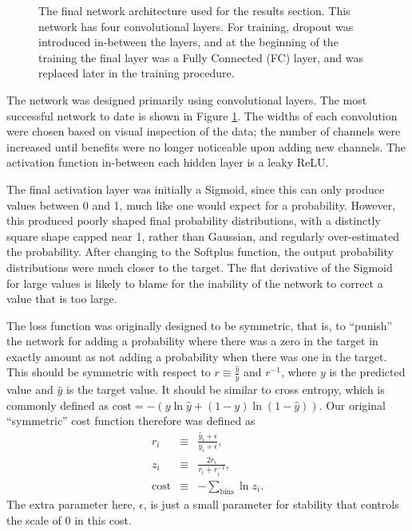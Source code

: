 \documentclass[a4paper]{jpconf}
\begin{document}
\begin{figure}
	\centering
	
	\caption{The final network architecture used for the results section. This network has four convolutional layers. For training, dropout was introduced in-between the layers, and at the beginning of the training the final layer was a Fully Connected (FC) layer, and was replaced later in the training procedure.}
	\label{fig:nnarch}
\end{figure}

The network was designed primarily using convolutional layers. The most successful network to date is shown in Figure \ref{fig:nnarch}. The widths of each convolution were chosen based on visual inspection of the data; the number of channels were increased until benefits were no longer noticeable upon adding new channels. The activation function in-between each hidden layer is a leaky ReLU.

The final activation layer was initially a Sigmoid, since this can only produce values between 0 and 1, much like one would expect for a probability. However, this produced poorly shaped final probability distributions, with a distinctly square shape capped near 1, rather than Gaussian, and regularly over-estimated the probability. After changing to the Softplus function, the output probability distributions were much closer to the target. The flat derivative of the Sigmoid for large values is likely to blame for the inability of the network to correct a value that is too large.

The loss function was originally designed to be symmetric, that is, to ``punish'' the network for adding a probability where there was a zero in the target in exactly amount as not adding a probability when there was one in the target. This should be symmetric with respect to  $r \equiv \frac{\hat y}{y}$ and $r^{-1}$, where $y$ is the predicted value and $\hat y$ is the target value. It should be similar to cross entropy, which is commonly defined as
%
$
\mathrm{cost} = - \left(
y \ln \hat y + (1-y) \ln (1 - \hat y)
\right)
$.
%
Our original ``symmetric'' cost function therefore was defined as
\begin{eqnarray}
r_i & \equiv & \frac{\hat y_i + \epsilon}{y_i + \epsilon}, \\
z_i & \equiv & \frac{2 r_i}{r_i + r_i^{-1}}, \\
\mathrm{cost}  & \equiv &- \sum_\mathrm{bins} \ln z_i.
\end{eqnarray}
%
The extra parameter here, $\epsilon$, is just a small parameter for stability that controls the scale of 0 in this cost.
\end{document}
